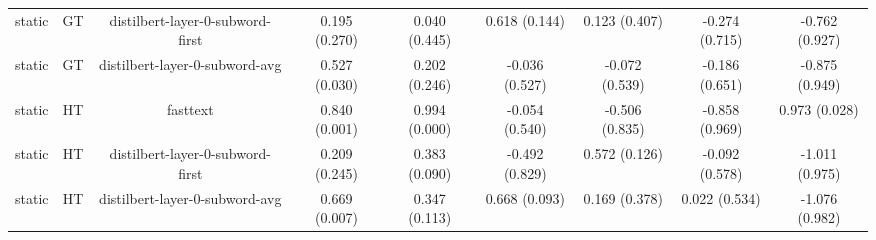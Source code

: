 \begin{sidewaystable}[htb]
\begin{tabular}{@{}ccccccccc@{}}
        static & GT & distilbert-layer-0-subword-first & 0.195 (0.270) & 0.040 (0.445) & 0.618 (0.144) & 0.123 (0.407) & -0.274 (0.715) & -0.762 (0.927) \\
        static & GT & distilbert-layer-0-subword-avg & 0.527 (0.030) & 0.202 (0.246) & -0.036 (0.527) & -0.072 (0.539) & -0.186 (0.651) & -0.875 (0.949) \\
        static & HT & fasttext & 0.840 (0.001) & 0.994 (0.000) & -0.054 (0.540) & -0.506 (0.835) & -0.858 (0.969) & 0.973 (0.028) \\
        static & HT & distilbert-layer-0-subword-first & 0.209 (0.245) & 0.383 (0.090) & -0.492 (0.829) & 0.572 (0.126) & -0.092 (0.578) & -1.011 (0.975) \\
        static & HT & distilbert-layer-0-subword-avg & 0.669 (0.007) & 0.347 (0.113) & 0.668 (0.093) & 0.169 (0.378) & 0.022 (0.534) & -1.076 (0.982) \\
        \bottomrule
    \end{tabular}
\end{sidewaystable}